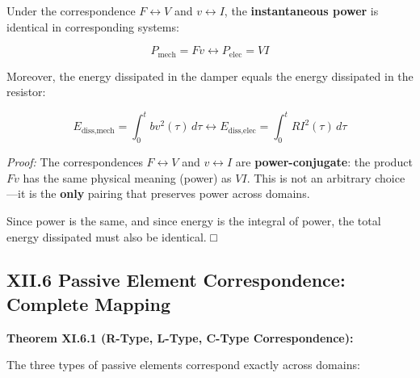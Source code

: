 \documentclass[
]{article}
\begin{document}
Under the correspondence \(F \leftrightarrow V\) and
\(v \leftrightarrow I\), the \textbf{instantaneous power} is identical
in corresponding systems:

\[P_{\text{mech}} = Fv \leftrightarrow P_{\text{elec}} = VI\]

Moreover, the energy dissipated in the damper equals the energy
dissipated in the resistor:

\[E_{\text{diss,mech}} = \int_0^t bv^2(\tau)\,d\tau \leftrightarrow E_{\text{diss,elec}} = \int_0^t RI^2(\tau)\,d\tau\]

\emph{Proof:} The correspondences \(F \leftrightarrow V\) and
\(v \leftrightarrow I\) are \textbf{power-conjugate}: the product \(Fv\)
has the same physical meaning (power) as \(VI\). This is not an
arbitrary choice---it is the \textbf{only} pairing that preserves power
across domains.

Since power is the same, and since energy is the integral of power, the
total energy dissipated must also be identical. □

\subsection{XII.6 Passive Element Correspondence: Complete
Mapping}\label{xii.6-passive-element-correspondence-complete-mapping}

\textbf{Theorem XI.6.1 (R-Type, L-Type, C-Type Correspondence):}

The three types of passive elements correspond exactly across domains:
\end{document}
